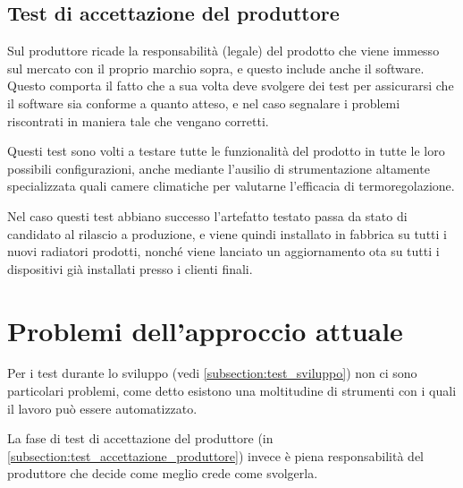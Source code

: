 \documentclass[12pt,a4paper,twoside,titlepage]{book}
\begin{document}
\subsection{Test di accettazione del produttore}
\label{subsection:test_accettazione_produttore}

Sul \gls{produttore} ricade la responsabilità (legale) del prodotto
che viene immesso sul mercato con il proprio marchio sopra, e questo include anche
il software. Questo comporta il fatto che a sua volta deve svolgere dei test per
assicurarsi che il software sia conforme a quanto atteso, e nel caso segnalare i
problemi riscontrati in maniera tale che vengano corretti.

Questi test sono volti a testare tutte le funzionalità del prodotto in tutte le loro
possibili configurazioni, anche mediante l'ausilio di strumentazione altamente
specializzata quali camere climatiche per valutarne l'efficacia di termoregolazione.

Nel caso questi test abbiano successo l'artefatto testato passa da stato di candidato
al rilascio a produzione, e viene quindi installato in fabbrica su tutti i nuovi radiatori
prodotti, nonché viene lanciato un aggiornamento \acrshort{ota} su tutti i dispositivi già installati
presso i clienti finali.

\section{Problemi dell'approccio attuale}

Per i test durante lo sviluppo (vedi \autoref{subsection:test_sviluppo}) non ci sono particolari problemi,
come detto esistono una moltitudine di strumenti con i quali il lavoro può essere automatizzato. 

La fase di test di accettazione del produttore (in \autoref{subsection:test_accettazione_produttore}) invece 
è piena responsabilità del \gls{produttore} che decide come meglio crede come svolgerla. 
\end{document}
